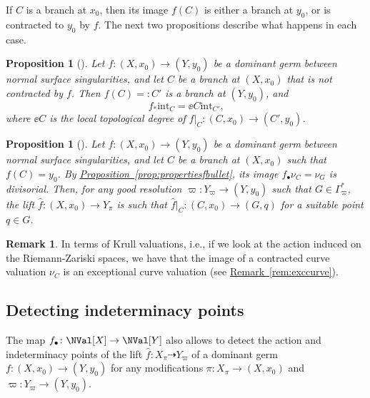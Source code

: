 \documentclass[11 pt, twoside, a4paper]{amsart}
\newcommand{\dgvert}[1]{\varGamma_{#1}^*}
\newtheorem{prop}[thm]{Proposition}
\theoremstyle{definition}
\newtheorem{rem}[thm]{Remark}
\theoremstyle{definition}
\newcommand{\inte}{\mathrm{int}}
\newcommand{\refprop}[1]{\hyperref[prop:#1]{Proposition~\ref*{prop:#1}}}
\newcommand{\refrem}[1]{\hyperref[rem:#1]{Remark~\ref*{rem:#1}}}
\begin{document}
If $C$ is a branch at $x_0$, then its image $f(C)$ is either a branch at $y_0$, or is contracted to $y_0$ by $f$.
The next two propositions describe what happens in each case.


\begin{prop}[{\cite[Prop. 2.6]{favre-jonsson:eigenval}}]\label{prop:imageinte}
Let $f \colon (X,x_0) \to (Y,y_0)$ be a dominant germ between normal surface singularities, and let $C$ be a branch at $(X,x_0)$ that is not contracted by $f$.
Then $f(C)=:C'$ is a branch at $(Y,y_0)$, and 
\[
f_* \inte_C = \ee{C} \inte_{C'}\text{,}
\]
where $\ee{C}$ is the local topological degree of $f|_C \colon (C,x_0) \to (C',y_0)$.
\end{prop}


\begin{prop}[{\cite[Prop. 2.7]{favre-jonsson:eigenval}}]\label{prop:imageccurve}
Let $f \colon (X,x_0) \to (Y,y_0)$ be a dominant germ between normal surface singularities, and let $C$ be a branch at $(X,x_0)$ such that $f(C)=y_0$.
By \refprop{propertiesfbullet}, its image $f_\bullet \nu_C = \nu_G$ is divisorial.
Then, for any good resolution $\varpi \colon Y_\varpi \to (Y,y_0)$ such that $G \in \dgvert{\varpi}$, the lift $\hat{f} \colon (X,x_0) \to Y_\pi$ is such that $\hat{f}|_C \colon (C,x_0) \to (G,q)$ for a suitable point $q \in G$.
\end{prop}

\begin{rem}
In terms of Krull valuations, i.e., if we look at the action induced on the Riemann-Zariski spaces, we have that the image of a contracted curve valuation $\nu_C$ is an exceptional curve valuation (see \refrem{exccurve}).
\end{rem}

\subsection{Detecting indeterminacy points}

The map $f_\bullet \colon \NVal[X] \to \NVal[Y]$ also allows to detect the action and indeterminacy points of the lift $\hat{f} \colon X_\pi \dashrightarrow Y_\varpi$ of a dominant germ $f \colon (X,x_0) \to (Y,y_0)$ for any modifications $\pi\colon X_\pi\to (X,x_0)$ and $\varpi\colon Y_\varpi\to (Y,y_0)$.
\end{document}
